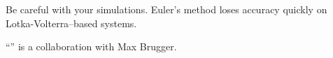 	Be careful with your simulations.  Euler's method loses accuracy quickly on Lotka-Volterra--based systems.




\vfill

\begin{graybox}
\hfill ``\lotkavolterratitle'' is a collaboration with Max Brugger.
\end{graybox}



\begin{noexercises}
\end{noexercises}